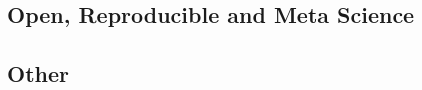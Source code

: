         \subsection*{Open, Reproducible and Meta Science} 
               \vspace*{1cm}
        
        \subsection*{Other} 
         \vspace*{1cm}
        
        